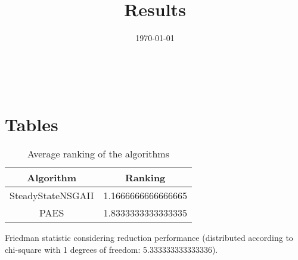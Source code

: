 \documentclass{article}
\title{Results}
\author{}
\date{\today}
\begin{document}
\oddsidemargin 0in \topmargin 0in\maketitle
\
\section{Tables}
\begin{table}[!htp]
\centering
\caption{Average ranking of the algorithms}
\begin{tabular}{c|c}
Algorithm&Ranking\\
\hline
SteadyStateNSGAII&1.1666666666666665\\
PAES&1.8333333333333335\\
\end{tabular}
\end{table}


Friedman statistic considering reduction performance (distributed according to chi-square with 1 degrees of freedom: 5.333333333333336).
\end{document}
